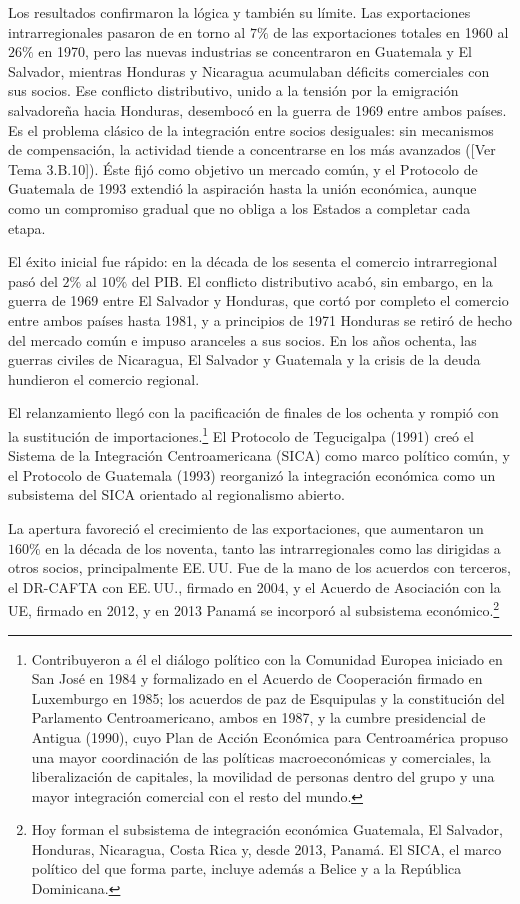 \documentclass[10pt,a4paper]{article}
\newcommand{\authorfont}[1]{{\fontfamily{EBGaramond-TLF}\selectfont #1}}
\begin{document}
{    Los resultados confirmaron la lógica y también su límite. Las exportaciones intrarregionales pasaron de en torno al $7\%$ de las exportaciones totales en 1960 al $26\%$ en 1970, pero las nuevas industrias se concentraron en Guatemala y El Salvador, mientras Honduras y Nicaragua acumulaban déficits comerciales con sus socios. Ese conflicto distributivo, unido a la tensión por la emigración salvadoreña hacia Honduras, desembocó en la guerra de 1969 entre ambos países. Es el problema clásico de la integración entre socios desiguales: sin mecanismos de compensación, la actividad tiende a concentrarse en los más avanzados ([\authorfont{Ver Tema 3.B.10}]).
} Éste fijó como objetivo un mercado común, y el Protocolo de Guatemala de 1993 extendió la aspiración hasta la unión económica, aunque como un compromiso gradual que no obliga a los Estados a completar cada etapa. 

El éxito inicial fue rápido: en la década de los sesenta el comercio intrarregional pasó del $2\%$ al $10\%$ del PIB. El conflicto distributivo acabó, sin embargo, en la guerra de 1969 entre El Salvador y Honduras, que cortó por completo el comercio entre ambos países hasta 1981, y a principios de 1971 Honduras se retiró de hecho del mercado común e impuso aranceles a sus socios. En los años ochenta, las guerras civiles de Nicaragua, El Salvador y Guatemala y la crisis de la deuda hundieron el comercio regional.

El relanzamiento llegó con la pacificación de finales de los ochenta y rompió con la sustitución de importaciones.\footnote{%
    Contribuyeron a él el diálogo político con la Comunidad Europea iniciado en San José en 1984 y formalizado en el Acuerdo de Cooperación firmado en Luxemburgo en 1985; los acuerdos de paz de Esquipulas y la constitución del Parlamento Centroamericano, ambos en 1987, y la cumbre presidencial de Antigua (1990), cuyo Plan de Acción Económica para Centroamérica propuso una mayor coordinación de las políticas macroeconómicas y comerciales, la liberalización de capitales, la movilidad de personas dentro del grupo y una mayor integración comercial con el resto del mundo.
} El Protocolo de Tegucigalpa (1991) creó el Sistema de la Integración Centroamericana (SICA) como marco político común, y el Protocolo de Guatemala (1993) reorganizó la integración económica como un subsistema del SICA orientado al regionalismo abierto. 

La apertura favoreció el crecimiento de las exportaciones, que aumentaron un $160\%$ en la década de los noventa, tanto las intrarregionales como las dirigidas a otros socios, principalmente EE.\,UU. Fue de la mano de los acuerdos con terceros, el DR-CAFTA con EE.\,UU., firmado en 2004, y el Acuerdo de Asociación con la UE, firmado en 2012, y en 2013 Panamá se incorporó al subsistema económico.\footnote{%
    Hoy forman el subsistema de integración económica Guatemala, El Salvador, Honduras, Nicaragua, Costa Rica y, desde 2013, Panamá. El SICA, el marco político del que forma parte, incluye además a Belice y a la República Dominicana.
}
\end{document}
